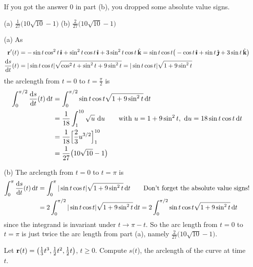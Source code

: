 \begin{hint} 
	If you got the answer $0$ in part (b), you dropped some absolute value signs.
\end{hint}

\begin{answer} 
	(a) $\frac{1}{27}\big(10\sqrt{10}-1\big)$\qquad
	(b) $\frac{2}{27}\big(10\sqrt{10}-1\big)$
\end{answer}

\begin{solution} (a)
	As
	\begin{align*}
	\vr'(t) & = -\sin t\cos^2 t\,\hi + \sin^2 t\cos t\,\hi + 3\sin^2 t\cos t\,\hk
	= \sin t\cos t\big(-\cos t\,\hi +\sin t\,\hj +3\sin t\,\hk\big) \\
	\diff{s}{t}(t) & = |\sin t\cos t|\sqrt{\cos^2 t + \sin ^2 t + 9\sin^2 t}
	= |\sin t\cos t|\sqrt{1+ 9\sin^2 t}
	\end{align*}
	the arclength from $t = 0$ to $t = \frac{\pi}{2}$ is
	\begin{align*}
	\int_0^{\pi/2} \diff{s}{t}(t)\,\dee{t}
	&=\int_0^{\pi/2} \sin t\cos t \sqrt{1+ 9\sin^2 t}\,\dee{t} \\
	&=\frac{1}{18}\int_1^{10} \sqrt{u}\ \dee{u} \qquad
	\text{with } u = 1+ 9\sin^2 t,\ \dee{u}  = 18\sin t\cos t\,\dee{t}\\
	&=\frac{1}{18}\Big[\frac{2}{3}u^{3/2}\Big]_1^{10}\\
	&=\frac{1}{27}\big(10\sqrt{10}-1\big)
	\end{align*}
	
	(b) The arclength from $t = 0$ to $t = \pi$ is
	\begin{align*}
	\int_0^{\pi} \diff{s}{t}(t)\,\dee{t}
	&=\int_0^{\pi} |\sin t\cos t| \sqrt{1+ 9\sin^2 t}\,\dee{t} 
	\qquad\text{Don't forget the absolute value signs!}\\
	&=2\int_0^{\pi/2} |\sin t\cos t| \sqrt{1+ 9\sin^2 t}\,\dee{t} 
	= 2\int_0^{\pi/2} \sin t\cos t \sqrt{1+ 9\sin^2 t}\,\dee{t} 
	\end{align*}
	since the integrand is invariant under $t\rightarrow\pi-t$. So the arc length
	from $t = 0$ to $t = \pi$ is just twice the arc length from part (a), namely $\frac{2}{27}\big(10\sqrt{10}-1\big)$.
	
\end{solution}
\begin{question}[M317 2017D] %
Let $\mathbf{r}(t)=\big(\frac{1}{3}t^3,\frac{1}{2}t^2,\frac{1}{2}t\big)$,
$t\ge 0$. Compute $s(t$), the arclength of the curve at time
$t$.
\end{question}


